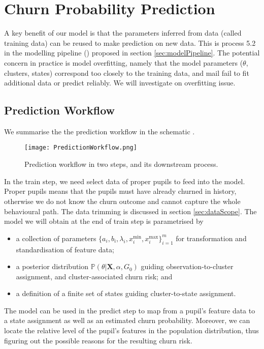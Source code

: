 \section{Churn Probability Prediction}
\label{sec:prediction}

A key benefit of our model is that the parameters inferred from data (called training data) can be reused to make prediction on new data. This is process 5.2 in the modelling pipeline () proposed in section \ref{sec:modelPipeline}. The potential concern in practice is model overfitting, namely that the model parameters ($\theta$, clusters, states) correspond too closely to the training data, and mail fail to fit additional data or predict reliably. We will investigate on overfitting issue.

\subsection{Prediction Workflow}

We summarise the the prediction workflow in the schematic .

\begin{figure}[!h]
\centering
\texttt{[image: PredictionWorkflow.png]}
\caption{Prediction workflow in two steps, and its downstream process.}
\label{fig:predictionWorkflow}
\end{figure}

In the train step, we need select data of proper pupils to feed into the model. Proper pupils means that the pupils must have already churned in history, otherwise we do not know the churn outcome and cannot capture the whole behavioural path. The data trimming is discussed in section \ref{sec:dataScope}. The model we will obtain at the end of train step is parametrised by
\begin{itemize}
\item a collection of parameters $\{ a_i, b_i, \lambda_i, x_i^\text{min}, x_i^\text{max}\}_{i=1}^m$ for transformation and standardisation of feature data;
\item a posterior distribution $\mathbb{P} (\theta | \mathbf{X}, \alpha, G_0)$ guiding observation-to-cluster assignment, and cluster-associated churn risk; and
\item a definition of a finite set of states guiding cluster-to-state assignment.
\end{itemize}
The model can be used in the predict step to map from a pupil's feature data to a state assignment as well as an estimated churn probability. Moreover, we can locate the relative level of the pupil's features in the population distribution, thus figuring out the possible reasons for the resulting churn risk.

